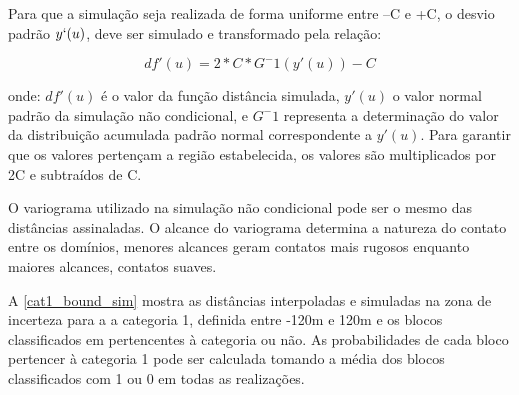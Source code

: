 Para que a simulação seja realizada de forma uniforme entre –C e +C, o desvio padrão $y`(u)$, deve ser simulado e transformado pela relação:

\begin{equation}
    df'(u)=2*C*G^-1(y'(u))-C
\end{equation}

onde: $df'(u)$ é o valor da função distância simulada, $y'(u)$ o valor normal padrão da simulação não condicional, e $G^-1$ representa a determinação do valor da distribuição acumulada padrão normal correspondente a $y'(u)$. Para garantir que os valores pertençam a região estabelecida, os valores são multiplicados por 2C e subtraídos de C.

O variograma utilizado na simulação não condicional pode ser o mesmo das distâncias assinaladas. O alcance do variograma determina a natureza do contato entre os domínios, menores alcances geram contatos mais rugosos enquanto maiores alcances, contatos suaves.

A \autoref{cat1_bound_sim} mostra as distâncias interpoladas e simuladas na zona de incerteza para a a categoria 1, definida entre -120m e 120m e os blocos classificados em pertencentes à categoria ou não. As probabilidades de cada bloco pertencer à categoria 1 pode ser calculada tomando a média dos blocos classificados com 1 ou 0 em todas as realizações.

